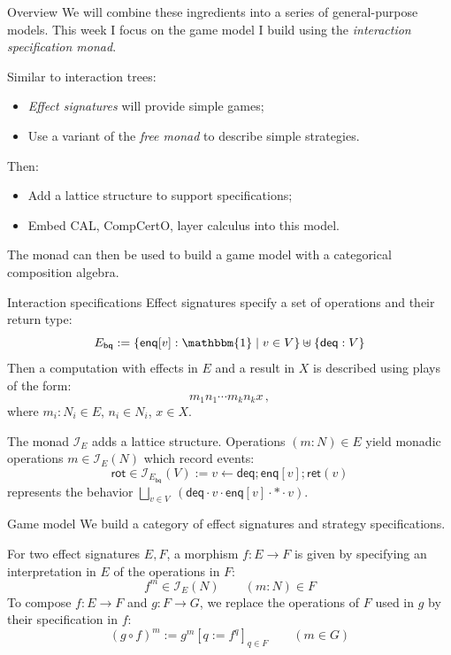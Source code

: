 \documentclass{beamer}
\begin{document}
\begin{frame}{Overview}
  We will combine these ingredients into
  a series of general-purpose models.
  This week I focus on the game model I build
  using the \emph{interaction specification monad}.

  \vfill
  Similar to interaction trees:
  \begin{itemize}
    \item \emph{Effect signatures} will provide simple games;
    \item Use a variant of the \emph{free monad} to
      describe simple strategies.
  \end{itemize}
  Then:
  \begin{itemize}
    \item Add a lattice structure to support specifications;
    \item Embed CAL, CompCertO, layer calculus into this model.
  \end{itemize}

  \vfill
  The monad can then be used to build a game model
  with a categorical composition algebra.
\end{frame}

\begin{frame}{Interaction specifications}
  Effect signatures specify a set of operations
  and their return type:
  \[
    E_\mathsf{bq} := \{ \mathsf{enq}[v] : \mathbbm{1} \mid v \in V \}
              \uplus \{ \mathsf{deq} : V \}
  \]
  Then a computation with effects in $E$ and a result in $X$
  is described using plays of the form:
  \[
    m_1 n_1 \cdots m_k n_k x \,,
  \]
  where $m_i : N_i \in E$, $n_i \in N_i$, $x \in X$.

  \vfill
  The monad $\mathcal{I}_E$ adds a lattice structure.
  Operations $(m : N) \in E$ yield
  monadic operations $m \in \mathcal{I}_E(N)$ which record events:
  \[
    \mathsf{rot} \in \mathcal{I}_{E_\mathsf{bq}}(V)
      := v \leftarrow \mathsf{deq} ;
        \mathsf{enq}[v] ; \mathsf{ret}(v)
  \]
  represents the behavior $
    \bigsqcup_{v \in V} \:
       (\mathsf{deq} \cdot v \cdot
        \mathsf{enq}[v] \cdot * \cdot v)$.
\end{frame}

\begin{frame}{Game model}
  We build a category of effect signatures
  and strategy specifications.

  For two effect signatures $E, F$,
  a morphism $f : E \rightarrow F$ is given by
  specifying an interpretation in $E$ of the operations in $F$:
  \[
    f^m \in \mathcal{I}_E(N) \qquad (m : N) \in F
  \]
  To compose $f : E \rightarrow F$ and $g : F \rightarrow G$,
  we replace the operations of $F$ used in $g$ by their
  specification in $f$:
  \[
    (g \circ f)^m := g^m[q := f^q]_{q \in F} \qquad (m \in G)
  \]
\end{frame}
\end{document}
